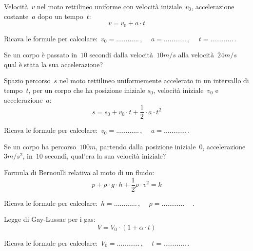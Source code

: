 \begin{esercizio}
\label{ese:20.61}
Velocità~$v$ nel moto rettilineo uniforme con velocità iniziale~$v_0$, 
accelerazione costante~$a$ dopo un tempo~$t$:
\begin{equation*}
  v=v_{0}+a\cdot t
\end{equation*}

Ricava le formule per calcolare:~$v_0=\ldots\ldots\ldots\ldots$\,, $\quad 
a=\ldots\ldots\ldots\ldots$\,, $\quad t =\ldots\ldots\ldots\ldots$\,.

Se un corpo è passato in~$10$ secondi dalla velocità~$10\unit{m/s}$ alla 
velocità~$24\unit{m/s}$ qual è stata la sua accelerazione?
\end{esercizio}

\begin{esercizio}
\label{ese:20.62}
Spazio percorso~$s$ nel moto rettilineo uniformemente accelerato in un 
intervallo di tempo~$t$, per un corpo che ha posizione iniziale
$s_0$, velocità iniziale~$v_0$ e accelerazione~$a$:
\begin{equation*}
  s=s_{0}+v_{0}\cdot t+\dfrac{1}{2}\cdot a\cdot t^{2}
\end{equation*}

Ricava le formule per calcolare:~$v_0=\ldots\ldots\ldots\ldots$\,, $\quad 
a=\ldots\ldots\ldots\ldots$\,.

Se un corpo ha percorso~$100\unit{m}$, partendo dalla posizione iniziale~$0$, 
accelerazione~$3\unit{m/s^2}$, in~$10$ secondi, qual'era la sua velocità 
iniziale?
\end{esercizio}

\begin{esercizio}
\label{ese:20.63}
Formula di Bernoulli relativa al moto di un fluido:
\begin{equation*}
  p+\rho \cdot g\cdot h+\dfrac{1}{2}\rho \cdot v^{2}=k
\end{equation*}

Ricava le formule per calcolare:~$h=\ldots\ldots\ldots\ldots$\,, $\quad 
\rho=\ldots\ldots\ldots\ldots\quad$\,.
\end{esercizio}

\begin{esercizio}
\label{ese:20.64}
Legge di Gay-Lussac per i gas:
\begin{equation*}
  V=V_{0}\cdot (1+\alpha \cdot t)
\end{equation*}

Ricava le formule per calcolare:~$V_0=\ldots\ldots\ldots\ldots$\,, $\quad 
t=\ldots\ldots\ldots\ldots$\,.
\end{esercizio}


